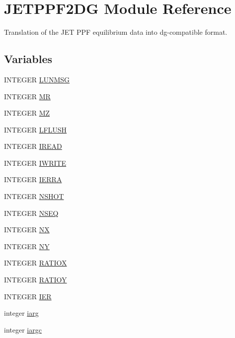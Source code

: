 \hypertarget{namespaceJETPPF2DG}{
\section{JETPPF2DG Module Reference}
\label{namespaceJETPPF2DG}
}
Translation of the JET PPF equilibrium data into dg-compatible format.  


\subsection*{Variables}
\begin{CompactItemize}
\item 
INTEGER \hyperlink{namespaceJETPPF2DG_258acbfd9dfc5ca34869c6edfdd89c8d}{LUNMSG}
\item 
INTEGER \hyperlink{namespaceJETPPF2DG_5e02219aa819d9f9f40ffb1884684f2c}{MR}
\item 
INTEGER \hyperlink{namespaceJETPPF2DG_887113770833f9aa581604f9474cb44c}{MZ}
\item 
INTEGER \hyperlink{namespaceJETPPF2DG_6db6d04641a552fe57c7f140cb8c09e6}{LFLUSH}
\item 
INTEGER \hyperlink{namespaceJETPPF2DG_5493047f501721b44b5e923dc3cd64d0}{IREAD}
\item 
INTEGER \hyperlink{namespaceJETPPF2DG_ab53f9bbac5ae7882b6288685910c67f}{IWRITE}
\item 
INTEGER \hyperlink{namespaceJETPPF2DG_47bfacdba737dd1c1fb6e676e5d5ace9}{IERRA}
\item 
INTEGER \hyperlink{namespaceJETPPF2DG_e270735b1159e8e19c3b3c52b0bb3d51}{NSHOT}
\item 
INTEGER \hyperlink{namespaceJETPPF2DG_1e11ff274dde21dbe30d2bb886dfd5b9}{NSEQ}
\item 
INTEGER \hyperlink{namespaceJETPPF2DG_a57c322f474d9c8344c098ffb1f2fbbc}{NX}
\item 
INTEGER \hyperlink{namespaceJETPPF2DG_fe7c59a5845e1d14c352d47c802827bb}{NY}
\item 
INTEGER \hyperlink{namespaceJETPPF2DG_7115e44048e1de47d26e48726e317603}{RATIOX}
\item 
INTEGER \hyperlink{namespaceJETPPF2DG_c27cb250b47cf21b49de19ad55baff1b}{RATIOY}
\item 
INTEGER \hyperlink{namespaceJETPPF2DG_bc3d3903b29c339401d382d43fd4ecc5}{IER}
\item 
integer \hyperlink{namespaceJETPPF2DG_ffda3e553d7afe1dc1f1b0b919addad8}{iarg}
\item 
integer \hyperlink{namespaceJETPPF2DG_d26188761e21fc3625e8c5ed7d44695c}{iargc}

\end{CompactItemize}
